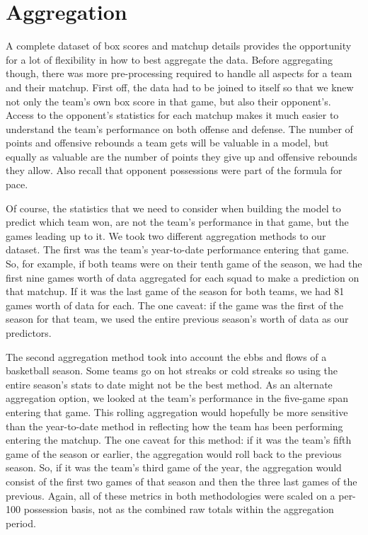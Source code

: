 \documentclass [MS] {uclathes}
\begin{document}
\section{Aggregation}

A complete dataset of box scores and matchup details provides the opportunity for a lot of flexibility in how to best aggregate the data. Before aggregating though, there was more pre-processing required to handle all aspects for a team and their matchup. First off, the data had to be joined to itself so that we knew not only the team's own box score in that game, but also their opponent's. Access to the opponent's statistics for each matchup makes it much easier to understand the team's performance on both offense and defense. The number of points and offensive rebounds a team gets will be valuable in a model, but equally as valuable are the number of points they give up and offensive rebounds they allow. Also recall that opponent possessions were part of the formula for pace. 

Of course, the statistics that we need to consider when building the model to predict which team won, are not the team's performance in that game, but the games leading up to it. We took two different aggregation methods to our dataset. The first was the team's year-to-date performance entering that game. So, for example, if both teams were on their tenth game of the season, we had the first nine games worth of data aggregated for each squad to make a prediction on that matchup. If it was the last game of the season for both teams, we had 81 games worth of data for each. The one caveat: if the game was the first of the season for that team, we used the entire previous season's worth of data as our predictors.  

The second aggregation method took into account the ebbs and flows of a basketball season. Some teams go on hot streaks or cold streaks so using the entire season's stats to date might not be the best method. As an alternate aggregation option, we looked at the team's performance in the five-game span entering that game. This rolling aggregation would hopefully be more sensitive than the year-to-date method in reflecting how the team has been performing entering the matchup. The one caveat for this method: if it was the team's fifth game of the season or earlier, the aggregation would roll back to the previous season. So, if it was the team's third game of the year, the aggregation would consist of the first two games of that season and then the three last games of the previous. Again, all of these metrics in both methodologies were scaled on a per-100 possession basis, not as the combined raw totals within the aggregation period. 
\end{document}
